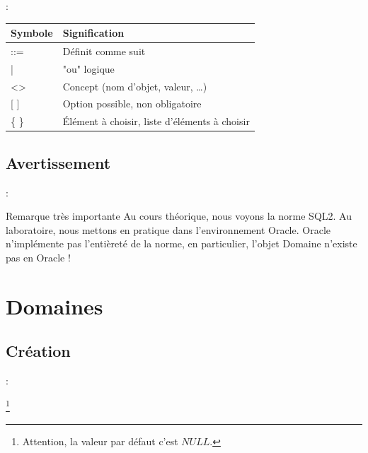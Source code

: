 \documentclass[10pt]{beamer}
\begin{document}
\begin{frame}{\secname : \subsecname}
    \begin{table}[]
        \begin{tabular}{|l|l|}
            \hline
            {Symbole}                   & {Signification}                                 \\ \hline
            {::=}                       & {Définit comme suit}                            \\ \hline
            {|}                         & {"ou" logique}                                  \\ \hline
            {\textless{}\textgreater{}} & {Concept (nom d'objet, valeur, …)}              \\ \hline
            {{[} {]}}                   & {Option possible, non obligatoire}              \\ \hline
            {\{ \}}                     & {Élément à choisir, liste d'éléments à choisir} \\ \hline
        \end{tabular}
    \end{table}
\end{frame}

\subsection{Avertissement}
\begin{frame}{\secname : \subsecname}
    \begin{alertblock}{Remarque très importante}
        Au cours théorique, nous voyons la norme SQL2.
        Au laboratoire, nous mettons en pratique dans l’environnement Oracle.
        Oracle n’implémente pas l’entièreté de la norme, en particulier, l’objet Domaine n’existe pas en Oracle !
    \end{alertblock}
\end{frame}



\section{Domaines}
\tocss
\subsection{Création}
\begin{frame}{\secname : \subsecname}
    
    \footnote{Attention, la valeur par défaut c'est $NULL$.}
\end{frame}
\end{document}
